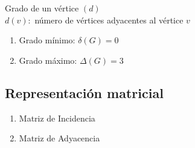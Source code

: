 \begin{definicion}
Grado de un vértice $(d)$ \\
$d(v):$ número de vértices adyacentes al vértice $v$
\begin{enumerate}
\item Grado mínimo: $\delta(G)=0$
\item Grado máximo: $\Delta(G)=3$
\end{enumerate}
\end{definicion}
\subsection{Representación matricial}
\begin{enumerate}
\item Matriz de Incidencia


\item Matriz de Adyacencia


\end{enumerate}

